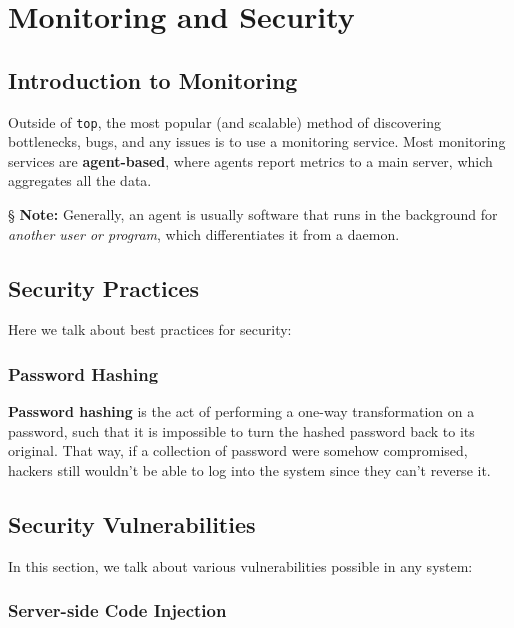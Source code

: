 \documentclass{report}
\newcommand{\npar}{\par\noindent}
\newcommand{\vpar}{\vspace{1em}\npar}
\newcommand{\note}{\vpar \S \textbf{ Note: }}
\begin{document}
\chapter{Monitoring and Security}

\section{Introduction to Monitoring}

\par Outside of \verb|top|, the most popular (and scalable) method of discovering bottlenecks, bugs, and any issues is to use a monitoring service. Most monitoring services are \textbf{agent-based}, where agents report metrics to a main server, which aggregates all the data. 

\note Generally, an agent is usually software that runs in the background for \textit{another user or program}, which differentiates it from a daemon.

\section{Security Practices}

\par Here we talk about best practices for security:

\subsection{Password Hashing}

\par \textbf{Password hashing} is the act of performing a one-way transformation on a password, such that it is impossible to turn the hashed password back to its original. That way, if a collection of password were somehow compromised, hackers still wouldn't be able to log into the system since they can't reverse it.

\section{Security Vulnerabilities}

\par In this section, we talk about various vulnerabilities possible in any system:

\subsection{Server-side Code Injection}
\end{document}

